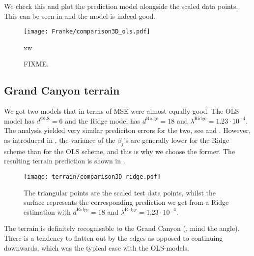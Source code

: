 We check this and plot the prediction model alongside the scaled data points. This can be seen in  and the model is indeed good. 

\begin{figure}
    \texttt{[image: Franke/comparison3D\_ols.pdf]}
    \caption{FIXME.}xw
    \label{fig:franke_final_model}
\end{figure}



\subsection{Grand Canyon terrain}

We got two models that in terms of MSE were almost equally good. The OLS model has $d^\text{OLS}=6$ and the Ridge model has $d^\text{Ridge}=18$ and $\lambda^\text{Ridge}=1.23\cdot10^{-4}$. The analysis yielded very similar prediciton errors for the two, see  and . However, as introduced in , the variance of the $\beta_j$'s are generally lower for the Ridge scheme than for the OLS scheme, and this is why we choose the former. The resulting terrain prediction is shown in .


\begin{figure}
    \texttt{[image: terrain/comparison3D\_ridge.pdf]}
    \caption{The triangular points are the scaled test data points, whilst the surface represents the corresponding prediction we get from a Ridge estimation with $d^\text{Ridge}=18$ and $\lambda^\text{Ridge}=1.23\cdot 10^{-4}$.}
    \label{fig:gc_final_model}
\end{figure}

The terrain is definitely recognisable to the Grand Canyon (, mind the angle). There is a tendency to flatten out by the edges as opposed to continuing downwards, which was the typical case with the OLS-models.
